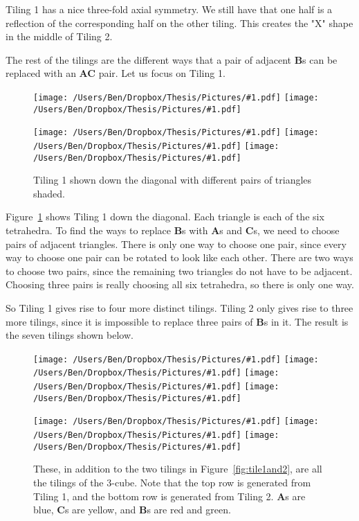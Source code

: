 \documentclass[12pt]{scrippsthesis}
\newcommand{\pic}[2]{\texttt{[image: /Users/Ben/Dropbox/Thesis/Pictures/\#1.pdf]}}
\theoremstyle{definition}
\theoremstyle{remark}
\theoremstyle{plain}
\begin{document}
Tiling 1 has a nice three-fold axial symmetry.  We still have that one half is a reflection of the corresponding half on the other tiling.  This creates the "X" shape in the middle of Tiling 2.

The rest of the tilings are the different ways that a pair of adjacent {\bf B}s can be replaced with an {\bf AC} pair.  Let us focus on Tiling 1.  

\begin{figure}[H]
\centerline{\hfill\hfill\hfill\hfill\hfill\hfill
\pic{hex1}{width=1.5in}\hfill
\pic{hex2}{width=1.5in}\hfill\hfill\hfill\hfill\hfill\hfill
} \medskip\medskip
\centerline{\hfill
\pic{hex3}{width=1.5in}\hfill
\pic{hex4}{width=1.5in}\hfill
\pic{hex5}{width=1.5in}\hfill
}

\caption{ Tiling 1 shown down the diagonal with different pairs of triangles shaded.}
\label{fig:hex}
\end{figure}

Figure~\ref{fig:hex} shows Tiling 1 down the diagonal.  Each triangle is each of the six tetrahedra.  To find the ways to replace {\bf B}s with {\bf A}s and {\bf C}s, we need to choose pairs of adjacent triangles.  There is only one way to choose one pair, since every way to choose one pair can be rotated to look like each other.  There are two ways to choose two pairs, since the remaining two triangles do not have to be adjacent.  Choosing three pairs is really choosing all six tetrahedra, so there is only one way.

So Tiling 1 gives rise to four more distinct tilings.  Tiling 2 only gives rise to three more tilings, since it is impossible to replace three pairs of {\bf B}s in it.  The result is the seven tilings shown below.



\begin{figure}[H]
\centerline{\hfill
\pic{tile3}{width=.25\textwidth}\hfill
\pic{tile5}{width=.25\textwidth}\hfill
\pic{tile7}{width=.25\textwidth}\hfill
\pic{tile9}{width=.25\textwidth}\hfill}
\centerline{\hfill
\pic{tile4}{width=.25\textwidth}\hfill
\pic{tile6}{width=.25\textwidth}\hfill
\pic{tile8}{width=.25\textwidth}\hfill}
\caption{ These, in addition to the two tilings in Figure~\ref{fig:tile1and2}, are all the tilings of the $3$-cube.  Note that the top row is generated from Tiling 1, and the bottom row is generated from Tiling 2.  {\bf A}s are blue, {\bf C}s are yellow, and {\bf B}s are red and green. }
\end{figure}
\end{document}
